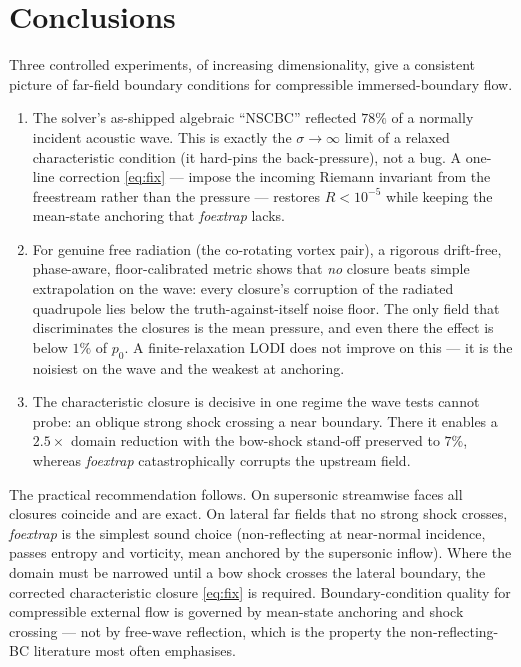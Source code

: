 \documentclass{jfm}
\begin{document}
\section{Conclusions}\label{sec:concl}
Three controlled experiments, of increasing dimensionality, give a consistent
picture of far-field boundary conditions for compressible immersed-boundary
flow.
\begin{enumerate}
\item The solver's as-shipped algebraic ``NSCBC'' reflected $78\%$ of a
normally incident acoustic wave. This is exactly the $\sigma\to\infty$ limit of
a relaxed characteristic condition (it hard-pins the back-pressure), not a bug.
A one-line correction \eqref{eq:fix} --- impose the incoming Riemann invariant
from the freestream rather than the pressure --- restores $R<10^{-5}$ while
keeping the mean-state anchoring that \textit{foextrap} lacks.
\item For genuine free radiation (the co-rotating vortex pair), a rigorous
drift-free, phase-aware, floor-calibrated metric shows that \emph{no} closure
beats simple extrapolation on the wave: every closure's corruption of the
radiated quadrupole lies below the truth-against-itself noise floor. The only
field that discriminates the closures is the mean pressure, and even there the
effect is below $1\%$ of $p_0$. A finite-relaxation LODI does not improve on
this --- it is the noisiest on the wave and the weakest at anchoring.
\item The characteristic closure is decisive in one regime the wave tests cannot
probe: an oblique strong shock crossing a near boundary. There it enables a
$2.5\times$ domain reduction with the bow-shock stand-off preserved to $7\%$,
whereas \textit{foextrap} catastrophically corrupts the upstream field.
\end{enumerate}
The practical recommendation follows. On supersonic streamwise faces all
closures coincide and are exact. On lateral far fields that no strong shock
crosses, \textit{foextrap} is the simplest sound choice (non-reflecting at
near-normal incidence, passes entropy and vorticity, mean anchored by the
supersonic inflow). Where the domain must be narrowed until a bow shock crosses
the lateral boundary, the corrected characteristic closure \eqref{eq:fix} is
required. Boundary-condition quality for compressible external flow is governed
by mean-state anchoring and shock crossing --- not by free-wave reflection,
which is the property the non-reflecting-BC literature most often emphasises.
\end{document}
